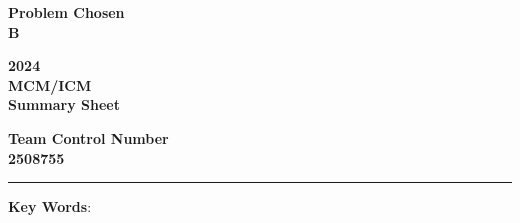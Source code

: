 \thispagestyle{empty}

\begin{figure*}[t]\centering
    \begin{minipage}[!t]{0.3\textwidth}
        \centering \bf 
        \Large Problem Chosen \\ 
        \Huge B \\ 
    \end{minipage}
    \begin{minipage}[!t]{0.3\textwidth}
        \centering \bf \large
        2024 \\ 
        MCM/ICM \\ 
        Summary Sheet \\
    \end{minipage}
    \begin{minipage}[!t]{0.3\textwidth}
        \centering \bf
        \large Team Control Number \\ 
        \Huge 2508755 \\ 
    \end{minipage}
    \begin{minipage}{\textwidth}
        \vspace*{10pt}
        \rule{\textwidth}{0.02cm}
    \end{minipage}
    \vspace*{-36pt}
\end{figure*}

\title{\bf \LARGE }\author{}\date{}\maketitle\vspace*{-30pt}



\vspace*{10pt}
\textbf{Key Words}: 
\newpage

\tableofcontents
\newpage